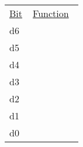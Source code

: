 \begin{tabular}{p{0.05\linewidth} p{0.2\linewidth} } 
\underline{Bit} & \underline{Function} \\
d6 & \\
d5 & \\
d4 & \\
d3 & \\
d2 & \\
d1 & \\
d0 & \\
\end{tabular}

